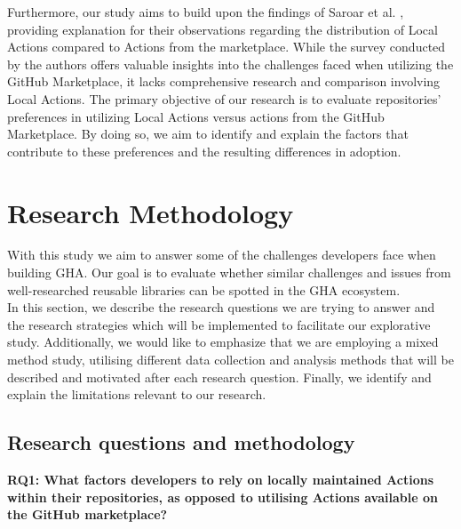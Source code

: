 \documentclass[conference]{IEEEtran}
\begin{document}
	Furthermore, our study aims to build upon the findings of Saroar et al. \cite{saroar2023developers}, providing explanation for their observations regarding the distribution of Local Actions compared to Actions from the marketplace. While the survey conducted by the authors offers valuable insights into the challenges faced when utilizing the GitHub Marketplace, it lacks comprehensive research and comparison involving Local Actions. The primary objective of our research is to evaluate repositories' preferences in utilizing Local Actions versus actions from the GitHub Marketplace. By doing so, we aim to identify and explain the factors that contribute to these preferences and the resulting differences in adoption.




\section{Research Methodology}
    With this study we aim to answer some of the challenges developers face when building GHA. Our goal is to evaluate whether similar challenges and issues from well-researched reusable libraries can be spotted in the GHA ecosystem.\\

    In this section, we describe the research questions we are trying to answer and the research strategies which will be implemented to facilitate our explorative study. Additionally, we would like to emphasize that we are employing a mixed method study, utilising different data collection and analysis methods that will be described and motivated after each research question. Finally, we identify and explain the limitations relevant to our research.

    \subsection{Research questions and methodology}
        \textbf{RQ1: What factors developers to rely on locally maintained Actions within their repositories, as opposed to utilising Actions available on the GitHub marketplace?}
        \\
\end{document}
